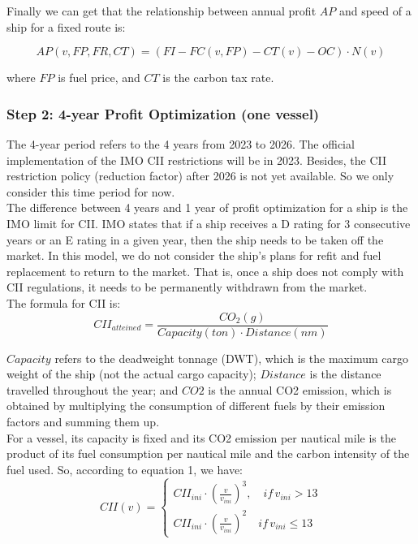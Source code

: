 \documentclass[a4paper,12pt]{article}
\begin{document}
Finally we can get that the relationship between annual profit $AP$ and speed of a ship for a fixed route is:

\begin{equation}
	\label{eq:annual_profit}
	AP(v, FP, FR, CT) = (FI-FC(v, FP)-CT(v)-OC) \cdot N(v)
\end{equation}

where $FP$ is fuel price, and $CT$ is the carbon tax rate.


\subsubsection{Step 2: 4-year Profit Optimization (one vessel)}
The 4-year period refers to the 4 years from 2023 to 2026. The official implementation of the IMO CII restrictions will be in 2023.
Besides, the CII restriction policy (reduction factor) after 2026 is not yet available.
So we only consider this time period for now.\\

The difference between 4 years and 1 year of profit optimization for a ship is the IMO limit for CII.
IMO states that if a ship receives a D rating for 3 consecutive years or an E rating in a given year, then the ship needs to be taken off the market.
In this model, we do not consider the ship's plans for refit and fuel replacement to return to the market.
That is, once a ship does not comply with CII regulations, it needs to be permanently withdrawn from the market.\\

The formula for CII is:
\begin{equation}
	\label{eq:cii}
	CII_{atteined} = \frac{CO_2(g)}{Capacity(ton) \cdot Distance(nm)}
\end{equation}

$Capacity$ refers to the deadweight tonnage (DWT), which is the maximum cargo weight of the ship (not the actual cargo capacity);
$Distance$ is the distance travelled throughout the year;
and $CO2$ is the annual CO2 emission, which is obtained by multiplying the consumption of different fuels by their emission factors and summing them up.\\

For a vessel, its capacity is fixed and its CO2 emission per nautical mile is the product of its fuel consumption per nautical mile and the carbon intensity of the fuel used.
So, according to equation 1, we have:
\begin{equation}
	\label{eq:cii_model}
	CII(v) =
	\left\{
	\begin{aligned}
		CII_{ini}\cdot (\frac{v}{v_{ini}})^3, \quad if \, v_{ini} > 13 \\
		CII_{ini} \cdot (\frac{v}{v_{ini}})^2 \quad if \, v_{ini}\leq 13
	\end{aligned}
	\right.
\end{equation}
\end{document}
